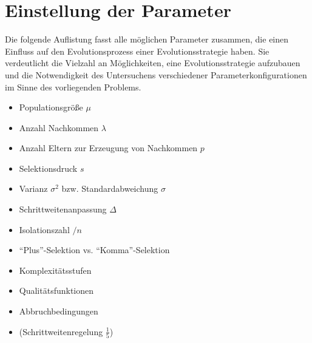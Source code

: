 
\section{Einstellung der Parameter}

Die folgende Auflistung fasst alle möglichen Parameter zusammen, die einen Einfluss auf den Evolutionsprozess einer Evolutionsstrategie haben. Sie verdeutlicht die Vielzahl an Möglichkeiten, eine Evolutionsstrategie aufzubauen und die Notwendigkeit des Untersuchens verschiedener Parameterkonfigurationen im Sinne des vorliegenden Problems.

\begin{itemize}
	\item Populationsgröße $\mu$
	\item Anzahl Nachkommen $\lambda$
	\item Anzahl Eltern zur Erzeugung von Nachkommen $p$
	\item Selektionsdruck $s$
	\item Varianz $\sigma^2$ bzw. Standardabweichung $\sigma$
	\item Schrittweitenanpassung $\Delta$
	\item Isolationszahl $/n$
	\item \enquote{Plus}-Selektion vs. \enquote{Komma}-Selektion
	\item Komplexitätsstufen
	\item Qualitätsfunktionen
	\item Abbruchbedingungen
	\item (Schrittweitenregelung $\frac{1}{5}$)
\end{itemize}
